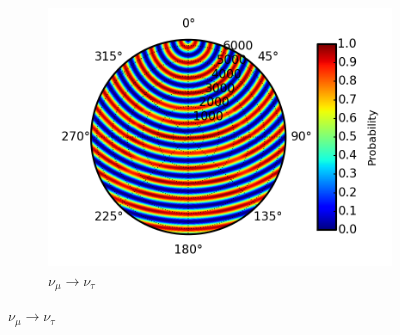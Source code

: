 \documentclass{beamer}
\begin{document}
\begin{frame}
\begin{figure}
\begin{subfigure}[b]{0.33\linewidth}
			\caption{ $\nu_{\mu} \rightarrow \nu_{\tau}$ }
			\includegraphics[width=\linewidth]{earth_1.0gev_numu2nutau_throughEarth.png}
		\end{subfigure}
	\end{figure}
\end{frame}
\end{document}
